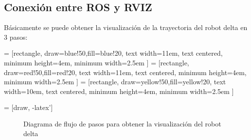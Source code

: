    \subsection{Conexión entre ROS y RVIZ}
   
           Básicamente se puede obtener la visualización de la trayectoria del robot delta en 3 pasos:


         = [rectangle, draw=blue!50,fill=blue!20, text width=11em, text centered, minimum height=4em, minimum width=2.5em ]
         = [rectangle, draw=red!50,fill=red!20, text width=11em, text centered, minimum height=4em, minimum width=2.5em ]
         = [rectangle, draw=yellow!50,fill=yellow!20, text width=10em, text centered, minimum height=4em, minimum width=2.5em ]
        
         = [draw, -latex']
         \begin{center}
         \begin{figure}[htb]
                \caption{Diagrama de flujo de pasos para obtener la visualización del robot delta}
                \label{f:cap6_trayectory_1}
         \end{figure}
         \end{center}
         
        \vspace{-1cm}   
        
